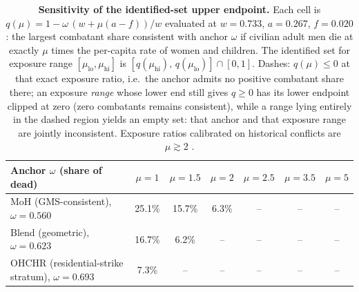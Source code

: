 \begin{table}[ht]
\centering
\caption{\textbf{Sensitivity of the identified-set upper endpoint.} Each cell is $q(\mu)=1-\omega\,(w+\mu(a-f))/w$ evaluated at $w=0.733$, $a=0.267$, $f=0.020$: the largest combatant share consistent with anchor $\omega$ if civilian adult men die at exactly $\mu$ times the per-capita rate of women and children. The identified set for exposure range $[\mu_{\mathrm{lo}},\mu_{\mathrm{hi}}]$ is $[q(\mu_{\mathrm{hi}}),\,q(\mu_{\mathrm{lo}})]\cap[0,1]$. Dashes: $q(\mu)\le 0$ at that exact exposure ratio, i.e.\ the anchor admits no positive combatant share there; an exposure \emph{range} whose lower end still gives $q\ge 0$ has its lower endpoint clipped at zero (zero combatants remains consistent), while a range lying entirely in the dashed region yields an empty set: that anchor and that exposure range are jointly inconsistent. Exposure ratios calibrated on historical conflicts are $\mu\gtrsim 2$ \citep{frost2026,cockerill2024}.}
\label{tab:sensitivity}
\begin{small}
\renewcommand{\arraystretch}{1.3}
\begin{tabular}{@{}lcccccc@{}}
\toprule
Anchor $\omega$ (share of dead) & $\mu{=}1$ & $\mu{=}1.5$ & $\mu{=}2$ & $\mu{=}2.5$ & $\mu{=}3.5$ & $\mu{=}5$ \\
\midrule
MoH (GMS-consistent), $\omega=0.560$ & 25.1\% & 15.7\% & 6.3\% & -- & -- & -- \\
Blend (geometric), $\omega=0.623$ & 16.7\% & 6.2\% & -- & -- & -- & -- \\
OHCHR (residential-strike stratum), $\omega=0.693$ & 7.3\% & -- & -- & -- & -- & -- \\
\bottomrule
\end{tabular}
\end{small}
\end{table}
